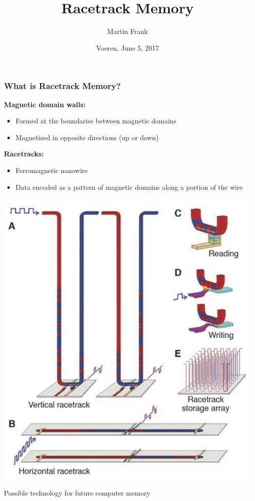 \documentclass{rwth-beamer}
\title[Magnetic Domain-Wall Racetrack Memory]{\TitleFont Racetrack Memory}
\author{Martin Frank}
\institute{MathCCES}
\date{Voeren, June 5, 2017}
\begin{document}
	\maketitle

	\begin{frame}[c]
		\frametitle{What is Racetrack Memory?}
		\begin{minipage}{0.7\linewidth} 
		{\bfseries Magnetic domain walls:}
		\begin{itemize}
			\item Formed at the boundaries between magnetic domains
			\item Magnetized in opposite directions (up or down)
		\end{itemize}
		{\bfseries Racetracks:}
		\begin{itemize}
			\item Ferromagnetic nanowire
			\item Data encoded as a pattern of magnetic domains along a portion of the wire
		\end{itemize}
		\end{minipage}\hfill
		\begin{minipage}{0.3\linewidth} 
		\includegraphics[width=0.9\linewidth]{../figs/RacetrackMemory}
		\end{minipage}				
		\begin{block}{}
		Possible technology for future computer memory
		\end{block}
		
	\end{frame}
\end{document}
